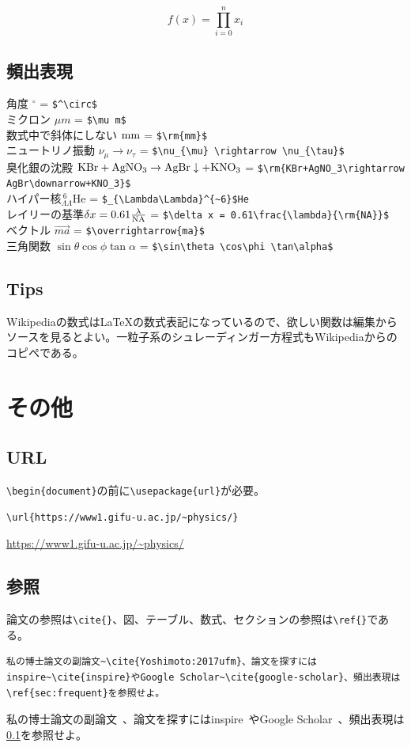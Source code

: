\documentclass[a4j]{jsarticle}
\begin{document}
\begin{equation}  f(x) = \prod_{i=0}^n x_i \end{equation}
\subsection{頻出表現}
\label{sec:frequent}
\noindent
角度 $^\circ$ = \verb|$^\circ$|\\
ミクロン $\mu m$ = \verb|$\mu m$|\\
数式中で斜体にしない $\rm{mm}$ = \verb|$\rm{mm}$|\\
ニュートリノ振動 $\nu_{\mu} \rightarrow \nu_{\tau}$ = \verb|$\nu_{\mu} \rightarrow \nu_{\tau}$|\\
臭化銀の沈殿 $\rm{KBr+AgNO_3\rightarrow AgBr\downarrow+KNO_3}$ = \verb|$\rm{KBr+AgNO_3\rightarrow AgBr\downarrow+KNO_3}$|\\
ハイパー核$_{\Lambda\Lambda}^{~6}$He = \verb|$_{\Lambda\Lambda}^{~6}$He|\\
レイリーの基準$\delta x = 0.61\frac{\lambda}{\rm{NA}}$ = \verb|$\delta x = 0.61\frac{\lambda}{\rm{NA}}$|\\
ベクトル $\overrightarrow{ma}$ = \verb|$\overrightarrow{ma}$|\\
三角関数 $\sin\theta \cos\phi \tan\alpha$ = \verb|$\sin\theta \cos\phi \tan\alpha$|

\subsection{Tips}
Wikipediaの数式は\LaTeX の数式表記になっているので、欲しい関数は編集からソースを見るとよい。一粒子系のシュレーディンガー方程式もWikipediaからのコピペである。
\newpage
\section{その他}
\subsection{URL}
\verb|\begin{document}|の前に\verb|\usepackage{url}|が必要。
\begin{verbatim}
\url{https://www1.gifu-u.ac.jp/~physics/}
\end{verbatim}
\url{https://www1.gifu-u.ac.jp/~physics/}

\subsection{参照}
論文の参照は\verb|\cite{}|、図、テーブル、数式、セクションの参照は\verb|\ref{}|である。
\begin{verbatim}
私の博士論文の副論文~\cite{Yoshimoto:2017ufm}、論文を探すにはinspire~\cite{inspire}やGoogle Scholar~\cite{google-scholar}、頻出表現は\ref{sec:frequent}を参照せよ。
\end{verbatim}
私の博士論文の副論文~\cite{Yoshimoto:2017ufm}、論文を探すにはinspire~\cite{inspire}やGoogle Scholar~\cite{google-scholar}、頻出表現は\ref{sec:frequent}を参照せよ。
\end{document}
